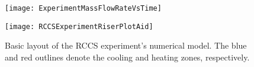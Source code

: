 \begin{figure}%
    \centering
    \caption[ Mass flow rate versus time for the three riser tubes]{   
        Mass flow rate versus time for the three riser tubes of the RCCS experiment with station blackout accident conditions. 
        The colors of the plot lines correspond to the riser colors in \cref{Figure:RCCSExperimentRiserPlotAid}.}%
    \label{Figure:ExperimentMassFlowRateVsTime}%
    \texttt{[image: ExperimentMassFlowRateVsTime]}\\[2em]%
    \caption[Basic layout of the RCCS experiment]{Basic layout of the RCCS experiment's numerical model.
             The blue and red outlines denote the cooling and heating zones, respectively.}%
    \label{Figure:RCCSExperimentRiserPlotAid}%
    \texttt{[image: RCCSExperimentRiserPlotAid]}%
\end{figure}
